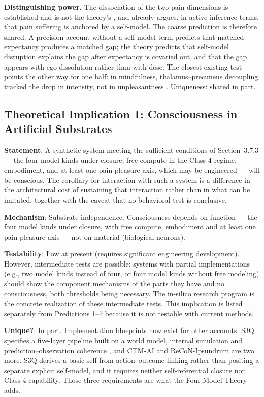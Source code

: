 \documentclass[12pt]{article}
\begin{document}
\textbf{Distinguishing power.} The dissociation of the two pain dimensions is established and is not the theory's \citep{Rainville1997,Perlman2010,Lee2013}, and \citet{Gerrans2020,Gerrans2024} already argues, in active-inference terms, that pain suffering is anchored by a self-model. The coarse prediction is therefore shared. A precision account without a self-model term predicts that matched expectancy produces a matched gap; the theory predicts that self-model disruption explains the gap after expectancy is covaried out, and that the gap appears with ego dissolution rather than with dose. The closest existing test points the other way for one half: in mindfulness, thalamus--precuneus decoupling tracked the drop in intensity, not in unpleasantness \citep{Riegner2023}. Uniqueness: shared in part.

\subsection{Theoretical Implication 1: Consciousness in Artificial Substrates}


\textbf{Statement}: A synthetic system meeting the sufficient conditions of Section~3.7.3 --- the four model kinds under closure, free compute in the Class 4 regime, embodiment, and at least one pain-pleasure axis, which may be engineered --- will be conscious. The corollary for interaction with such a system is a difference in the architectural cost of sustaining that interaction rather than in what can be imitated, together with the caveat that no behavioral test is conclusive.

\textbf{Mechanism}: Substrate independence. Consciousness depends on function --- the four model kinds under closure, with free compute, embodiment and at least one pain-pleasure axis --- not on material (biological neurons).

\textbf{Testability}: Low at present (requires significant engineering development). However, intermediate tests are possible: systems with partial implementations (e.g., two model kinds instead of four, or four model kinds without free modeling) should show the component mechanisms of the parts they have and no consciousness, both thresholds being necessary. The in-silico research program is the concrete realization of these intermediate tests. This implication is listed separately from Predictions 1--7 because it is not testable with current methods.

\textbf{Unique?}: In part. Implementation blueprints now exist for other accounts: S3Q specifies a five-layer pipeline built on a world model, internal simulation and prediction--observation coherence \citep{Grinberg2026}, and CTM-AI \citep{Yu2026} and ReCoN-Ipsundrum \citep{Sanyal2026} are two more. S3Q derives a basic self from action--outcome linking rather than positing a separate explicit self-model, and it requires neither self-referential closure nor Class 4 capability. Those three requirements are what the Four-Model Theory adds.
\end{document}
